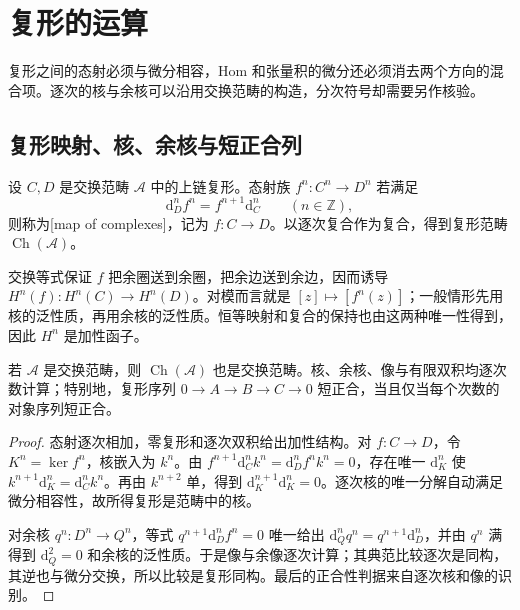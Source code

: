 
\section{复形的运算}
\label{b4:sec:0502}

复形之间的态射必须与微分相容，Hom 和张量积的微分还必须消去两个方向的混合项。逐次的核与余核可以沿用交换范畴的构造，分次符号却需要另作核验。

%
%

\subsection{复形映射、核、余核与短正合列}
\label{b4:subsec:0502:01}

\begin{definition}\label{b4:def:complex-map}
设 \(C,D\) 是交换范畴 \(\mathcal A\) 中的上链复形。态射族 \(f^n:C^n\to D^n\) 若满足
\[
\mathrm{d}_D^nf^n=f^{n+1}\mathrm{d}_C^n\qquad(n\in\mathbb Z),
\]
则称为[map of complexes]，记为 \(f:C\to D\)。以逐次复合作为复合，得到复形范畴 \(\operatorname{Ch}(\mathcal A)\)。
\end{definition}

交换等式保证 \(f\) 把余圈送到余圈，把余边送到余边，因而诱导 \(H^n(f):H^n(C)\to H^n(D)\)。对模而言就是 \([z]\mapsto[f^n(z)]\)；一般情形先用核的泛性质，再用余核的泛性质。恒等映射和复合的保持也由这两种唯一性得到，因此 \(H^n\) 是加性函子。

\begin{proposition}\label{b4:prop:complex-category-abelian}
若 \(\mathcal A\) 是交换范畴，则 \(\operatorname{Ch}(\mathcal A)\) 也是交换范畴。核、余核、像与有限双积均逐次数计算；特别地，复形序列 \(0\to A\to B\to C\to0\) 短正合，当且仅当每个次数的对象序列短正合。
\end{proposition}
\begin{proof}
态射逐次相加，零复形和逐次双积给出加性结构。对 \(f:C\to D\)，令 \(K^n=\ker f^n\)，核嵌入为 \(k^n\)。由 \(f^{n+1}\mathrm{d}_C^nk^n=\mathrm{d}_D^nf^nk^n=0\)，存在唯一 \(\mathrm{d}_K^n\) 使 \(k^{n+1}\mathrm{d}_K^n=\mathrm{d}_C^nk^n\)。再由 \(k^{n+2}\) 单，得到 \(\mathrm{d}_K^{n+1}\mathrm{d}_K^n=0\)。逐次核的唯一分解自动满足微分相容性，故所得复形是范畴中的核。

对余核 \(q^n:D^n\to Q^n\)，等式 \(q^{n+1}\mathrm{d}_D^nf^n=0\) 唯一给出 \(\mathrm{d}_Q^nq^n=q^{n+1}\mathrm{d}_D^n\)，并由 \(q^n\) 满得到 \(\mathrm{d}_Q^2=0\) 和余核的泛性质。于是像与余像逐次计算；其典范比较逐次是同构，其逆也与微分交换，所以比较是复形同构。最后的正合性判据来自逐次核和像的识别。
\end{proof}

